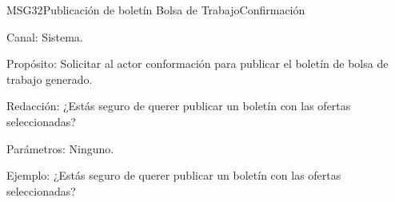 \begin{mensaje}{MSG32}{Publicación de boletín Bolsa de Trabajo}{Confirmación}
	\item[Canal:] Sistema.
    \item[Propósito:] Solicitar al actor conformación para publicar el boletín de bolsa de trabajo generado.
    \item[Redacción:] ¿Estás seguro de querer publicar un boletín con las ofertas seleccionadas?
    \item[Parámetros:] Ninguno.
    \item[Ejemplo:] ¿Estás seguro de querer publicar un boletín con las ofertas seleccionadas?
\end{mensaje}
